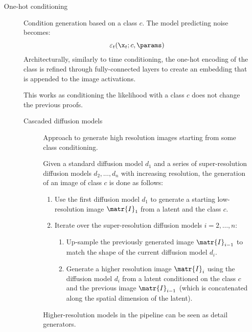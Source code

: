 \begin{description}
    \item[One-hot conditioning] 
        Condition generation based on a class $c$. The model predicting noise becomes:
        \[ \varepsilon_t(\x_t; c, \params) \]
        Architecturally, similarly to time conditioning, the one-hot encoding of the class is refined through fully-connected layers to create an embedding that is appended to the image activations.

        \begin{remark}
            This works as conditioning the likelihood with a class $c$ does not change the previous proofs.
        \end{remark}

        \begin{description}
            \item[Cascaded diffusion models] 
                Approach to generate high resolution images starting from some class conditioning.

                Given a standard diffusion model $d_1$ and a series of super-resolution diffusion models $d_2, \dots, d_n$ with increasing resolution, the generation of an image of class $c$ is done as follows:
                \begin{enumerate}
                    \item Use the first diffusion model $d_1$ to generate a starting low-resolution image $\matr{I}_1$ from a latent and the class $c$.
                    \item Iterate over the super-resolution diffusion models $i=2, \dots, n$:
                    \begin{enumerate}
                        \item Up-sample the previously generated image $\matr{I}_{i-1}$ to match the shape of the current diffusion model $d_i$.
                        \item Generate a higher resolution image $\matr{I}_i$ using the diffusion model $d_i$ from a latent conditioned on the class $c$ and the previous image $\matr{I}_{i-1}$ (which is concatenated along the spatial dimension of the latent).
                    \end{enumerate}
                \end{enumerate}

            \begin{remark}
                Higher-resolution models in the pipeline can be seen as detail generators.
            \end{remark}


\end{description}
\end{description}
